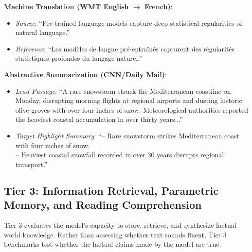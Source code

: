 \documentclass[../../../main.tex]{subfiles}
\begin{document}
\begin{center}
\begin{minipage}{0.95\textwidth}
\begin{tcolorbox}[colback=cardBg,colframe=cardLine,arc=2pt,boxrule=0.5pt,title=\textbf{Task Example: Conditional Sequence Generation (Translation \& Summarization)}]
\small\sffamily
\textbf{Machine Translation (WMT English $\to$ French)}:
\begin{itemize}[leftmargin=1.5em,itemsep=1pt]
    \item \textit{Source}: ``Pre-trained language models capture deep statistical regularities of natural language.''
    \item \textit{Reference}: ``Les modèles de langue pré-entraînés capturent des régularités statistiques profondes du langage naturel.''
\end{itemize}
\textbf{Abstractive Summarization (CNN/Daily Mail)}:
\begin{itemize}[leftmargin=1.5em,itemsep=1pt]
    \item \textit{Lead Passage}: ``A rare snowstorm struck the Mediterranean coastline on Monday, disrupting morning flights at regional airports and dusting historic olive groves with over four inches of snow. Meteorological authorities reported the heaviest coastal accumulation in over thirty years...''
    \item \textit{Target Highlight Summary}: ``-- Rare snowstorm strikes Mediterranean coast with four inches of snow. \\ -- Heaviest coastal snowfall recorded in over 30 years disrupts regional transport.''
\end{itemize}
\end{tcolorbox}
\end{minipage}
\end{center}

\subsection{Tier 3: Information Retrieval, Parametric Memory, and Reading Comprehension}
\label{subsec:tier3_qa_memory}

Tier 3 evaluates the model's capacity to store, retrieve, and synthesize factual world knowledge. Rather than assessing whether text sounds fluent, Tier 3 benchmarks test whether the factual claims made by the model are true.
\end{document}
